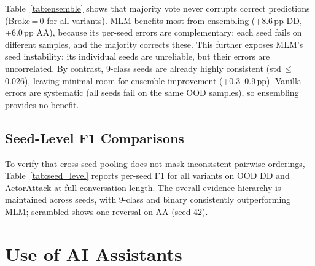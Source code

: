 Table~\ref{tab:ensemble} shows that majority vote never corrupts correct predictions (Broke\,=\,0 for all variants). MLM benefits most from ensembling (+8.6\,pp DD, +6.0\,pp AA), because its per-seed errors are complementary: each seed fails on different samples, and the majority corrects these. This further exposes MLM's seed instability: its individual seeds are unreliable, but their errors are uncorrelated. By contrast, 9-class seeds are already highly consistent (std\,$\leq$\,0.026), leaving minimal room for ensemble improvement (+0.3--0.9\,pp). Vanilla errors are systematic (all seeds fail on the same OOD samples), so ensembling provides no benefit.

\subsection{Seed-Level F1 Comparisons}
\label{app:seed_level}

To verify that cross-seed pooling does not mask inconsistent pairwise orderings, Table~\ref{tab:seed_level} reports per-seed F1 for all variants on OOD DD and ActorAttack at full conversation length. The overall evidence hierarchy is maintained across seeds, with 9-class and binary consistently outperforming MLM; scrambled shows one reversal on AA (seed 42).

\begin{table}[h]
\centering
\small
\caption{Per-seed F1 on OOD Full for key variants (seeds 42, 123, 456). The relative ordering is consistent across seeds.}
\label{tab:seed_level}
\end{table}

\section*{Use of AI Assistants}
\label{app:ai-assistants}

